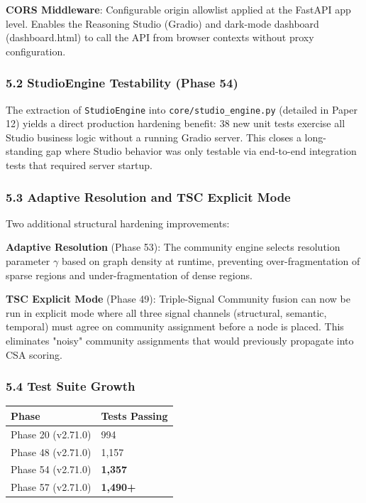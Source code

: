 \textbf{CORS Middleware}: Configurable origin allowlist applied at the FastAPI app level. Enables the Reasoning Studio (Gradio) and dark-mode dashboard (dashboard.html) to call the API from browser contexts without proxy configuration.

\subsubsection*{5.2 StudioEngine Testability (Phase 54)}
The extraction of \texttt{StudioEngine} into \texttt{core/studio\_engine.py} (detailed in Paper 12) yields a direct production hardening benefit: 38 new unit tests exercise all Studio business logic without a running Gradio server. This closes a long-standing gap where Studio behavior was only testable via end-to-end integration tests that required server startup.

\subsubsection*{5.3 Adaptive Resolution and TSC Explicit Mode}
Two additional structural hardening improvements:

\textbf{Adaptive Resolution} (Phase 53): The community engine selects resolution parameter $\gamma$ based on graph density at runtime, preventing over-fragmentation of sparse regions and under-fragmentation of dense regions.

\textbf{TSC Explicit Mode} (Phase 49): Triple-Signal Community fusion can now be run in explicit mode where all three signal channels (structural, semantic, temporal) must agree on community assignment before a node is placed. This eliminates "noisy" community assignments that would previously propagate into CSA scoring.

\subsubsection*{5.4 Test Suite Growth}
\begin{table}[h]
\small\centering
\begin{tabular}{ll}
\toprule
Phase & Tests Passing \\
\midrule
Phase 20 (v2.71.0) & 994 \\
Phase 48 (v2.71.0) & 1,157 \\
Phase 54 (v2.71.0) & \textbf{1,357} \\
Phase 57 (v2.71.0) & \textbf{1,490+} \\
\bottomrule
\end{tabular}
\end{table}


